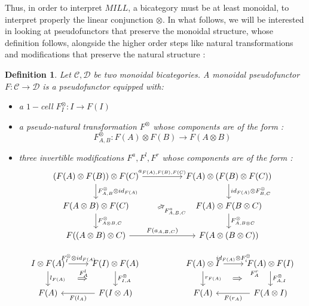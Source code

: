 \documentclass[a4paper, 12pt, twoside,openright]{report}
\newtheorem{definition}{Definition}
\begin{document}
Thus, in order to interpret $MILL$, a bicategory must be at least monoidal, to interpret properly the linear conjunction $\otimes$. In what follows, we will be interested in looking at pseudofunctors that preserve the monoidal structure, whose definition follows, alongside the higher order steps like natural transformations and modifications that preserve the natural structure : 

\begin{definition}
Let $\mathcal{C}, \mathcal{D}$ be two monoidal bicategories. A monoidal pseudofunctor $F : \mathcal{C} \rightarrow \mathcal{D}$ is a pseudofunctor equipped with:
\begin{itemize}
\item a $1-$cell $F_{I}^{\otimes}: I \rightarrow F(I)$
\item a pseudo-natural transformation $F^\otimes$ whose components are of the form : $$F_{A,B}^\otimes : F(A) \otimes F(B) \rightarrow F(A \otimes B)$$
\item three invertible modifications $F^a, F^l, F^r$ whose components are of the form : 
$$
\begin{tikzcd}
(F(A) \otimes F(B)) \otimes F(C)
\arrow{rr}{a_{F(A),F(B),F(C)}}
\arrow{d}{F_{A,B}^{\otimes} \otimes id_{F(A)}}
&&
F(A) \otimes (F(B) \otimes F(C))
\arrow{d}{id_{F(A)} \otimes F_{B,C}^\otimes}
\\
F(A\otimes B) \otimes F(C)
\arrow{d}{F_{A\otimes B, C}^\otimes}
&&
F(A) \otimes F(B \otimes C)
\arrow{d}{F_{A,B\otimes C}^\otimes}
\\
F((A \otimes B) \otimes C)
\arrow{rr}{F(a_{A,B,C})}
\arrow[Rightarrow, shorten >=2.2cm, shorten <=2.1cm]{rruu}[swap]{F^{a}_{A,B,C}}
&&
F(A \otimes (B \otimes C))
\end{tikzcd}$$

$$\begin{tikzcd}
I \otimes F(A)
\arrow{r}{F_{I}^\otimes \otimes id_{F(A)}}
\arrow{d}{l_{F(A)}}[name=A]{}
&
F(I) \otimes F(A)
\arrow{d}{F_{I,A}^\otimes}[name=B]{}
\arrow[Rightarrow, shorten >=1.2cm, shorten <=1.1cm,from=A,to=B]{}[]{F_{A}^l}
&&
F(A) \otimes I
\arrow{r}{id_{F(A)} \otimes F_{i}^\otimes}
\arrow{d}{r_{F(A)}}[name=C]{}
&
F(A) \otimes F(I)
\arrow{d}{F_{A,I}^\otimes}[name=D]{}
\arrow[Rightarrow, shorten >=1.2cm, shorten <=1.1cm,from=C,to=D]{}[near end]{F_{A}^r}
\\
F(A)
&
F(I \otimes A)
\arrow{l}{F(l_A)}
&&
F(A)
&
F(A \otimes I)
\arrow{l}{F(r_A)}
\end{tikzcd}$$


\end{itemize}
\end{definition}
\end{document}
